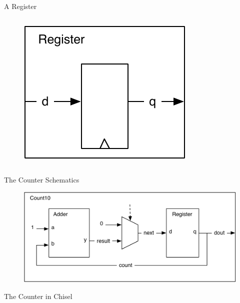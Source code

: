 \begin{frame}[fragile]{A Register}
\begin{columns}
\begin{column}{0.4\textwidth}
\begin{figure}
  \includegraphics[scale=\scale]{../figures/components-register}
\end{figure}
\end{column}
\begin{column}{0.6\textwidth}
\end{column}
\end{columns}
\end{frame}

\begin{frame}[fragile]{The Counter Schematics}
\begin{figure}
  \includegraphics[scale=0.6]{../figures/components-counter}
\end{figure}
\end{frame}

\begin{frame}[fragile]{The Counter in Chisel}
\end{frame}

